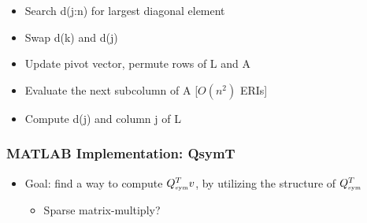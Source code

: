 \documentclass[bigger]{beamer}
\begin{document}
\begin{frame}
\begin{itemize}
\begin{itemize}
\begin{itemize}
\item Search d(j:n) for largest diagonal element
\label{sec-1-27-3-2-1}%

\item Swap d(k) and d(j)
\label{sec-1-27-3-2-2}%

\item Update pivot vector, permute rows of L and A
\label{sec-1-27-3-2-3}%

\item Evaluate the next subcolumn of A [$O(n^2)$ ERIs]
\label{sec-1-27-3-2-4}%

\item Compute d(j) and column j of L
\label{sec-1-27-3-2-5}%
\end{itemize} %
\end{itemize} %
\end{itemize} %
\end{frame}
\begin{frame}
\frametitle{MATLAB Implementation: QsymT}
\label{sec-1-28}
\begin{itemize}

\item Goal: find a way to compute $Q_{{\mbox{\tiny sym}}}^Tv$,  by utilizing the structure of $Q_{{\mbox{\tiny sym}}}^T$
\label{sec-1-28-1}%
\begin{itemize}

\item Sparse matrix-multiply?
\label{sec-1-28-1-1}%
\end{itemize} %
\end{itemize} %
\end{frame}
\end{document}
